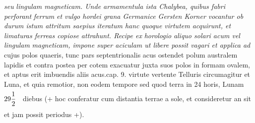                       \protect{}
                      \textit{ seu }\textit{lingulam magneticam}\protect{}\textit{.  Unde armamentula ista Chalybea, quibus fabri perforant }\textit{ferrum}\protect{}\textit{ et vulgo hordei grana  Germanice Gersten Korner vocantur ob  durum istum attritum saepius iteratum  hanc quoque virtutem acquirunt, et limaturas  ferreas copiose attrahunt. Recipe  ex }\textit{horologio}\protect{}\textit{ aliquo solari acum vel lingulam }\textit{magneticam}\protect{}\textit{, impone super aciculam ut libere  possit vagari et applica ad }\textit{} cujus polos\protect{} quaeris, tunc pars septentrionalis acus  ostendet polum australem\protect{} lapidis et contra  postea per cotem exacuatur juxta suos polos  in formam ovalem, et aptus erit imbuendis  aliis acus\protect{}.\pend \pstart  cap. 9. virtute vertente Telluris\protect{}  circumagitur et Luna\protect{}, et quia remotior, non  eodem tempore sed quod terra\protect{} in 24 horis, Lunam\protect{} $\displaystyle 29\frac{1}{2}\rule[-4mm]{0mm}{10mm}\hspace{5.5pt}$%
                     diebus (+ hoc conferatur cum  distantia terrae\protect{} a sole\protect{}, et consideretur an  sit et jam possit   periodus +).
